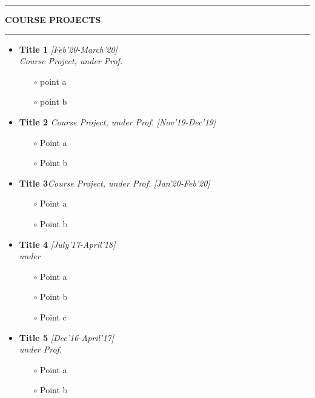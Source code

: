 \documentclass[10pt]{extarticle}
\begin{document}
\noindent\rule[0ex]{\linewidth}{0.5mm}
{ \textbf{\textsc{COURSE PROJECTS}}}
\noindent\rule[1.5ex]{\linewidth}{0.5mm}
\begin{itemize}
    \item \textbf{Title 1} \hfill\emph{[Feb'20-March'20]}\\
    \emph{Course Project, under Prof.}
    \begin{itemize}
        \item[$\circ$] point a
        \item [$\circ$] point b
    \end{itemize}
     
    \item \textbf{Title 2} \emph{Course Project, under Prof.} \hfill\emph{[Nov'19-Dec'19]}\\
     \begin{itemize}
        \item [$\circ$]Point a
        \item [$\circ$] Point b
     \end{itemize}
    \item \textbf{Title 3}\emph{Course Project, under Prof.} \hfill\emph{[Jan'20-Feb'20]}\\
    
    \begin{itemize}
        \item[$\circ$] Point a
        \item[$\circ$] Point b
    \end{itemize}
    
   \item \textbf{Title 4} \hfill\emph{[July'17-April'18]}\\
   \emph{under }
   \begin{itemize}[noitemsep,nolistsep]
   \item [$\circ$] Point a
   \item [$\circ$] Point b
   \item [$\circ$] Point c
    \end{itemize}
    \item \textbf{Title 5} \hfill\emph{[Dec'16-April'17]}\\
    \emph{under Prof. }
    \begin{itemize}
        \item [$\circ$] Point a
        \item [$\circ$] Point b
    \end{itemize}
\end{itemize}
\end{document}
